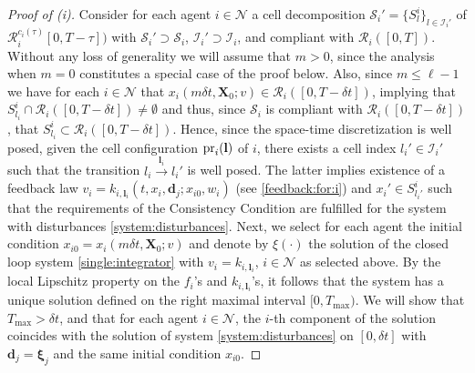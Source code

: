 \documentclass[reqno]{amsart}
\theoremstyle{plain}
\theoremstyle{definition}
\numberwithin{equation}{section}
\begin{document}
\begin{proof}[Proof of (i)]
Consider for each agent $i\in{\ensuremath{\mathcal{N}}}$ a cell decomposition ${\ensuremath{\mathcal{S}}}_i'=\{S_{l}^i\}_{l\in{\ensuremath{\mathcal{I}}}_i'}$ of ${\ensuremath{\mathcal{R}}}_i^{c_i(\tau)}[0,T-\tau])$ with ${\ensuremath{\mathcal{S}}}_i'\supset {\ensuremath{\mathcal{S}}}_i$, ${\ensuremath{\mathcal{I}}}_i'\supset {\ensuremath{\mathcal{I}}}_i$, and compliant with ${\ensuremath{\mathcal{R}}}_i([0,T])$. Without any loss of generality we will assume that $m>0$, since the analysis when $m=0$ constitutes a special case of the proof below. Also, since $m\le\ell-1$ we have for each $i\in{\ensuremath{\mathcal{N}}}$ that $x_i(m\delta t,{\textbf{{X}}}_0;v)\in{\ensuremath{\mathcal{R}}}_i([0,T-\delta t])$, implying that $S_{l_i}^i\cap {\ensuremath{\mathcal{R}}}_i([0,T-\delta t])\ne \emptyset$ and thus, since ${\ensuremath{\mathcal{S}}}_i$ is compliant with ${\ensuremath{\mathcal{R}}}_i([0,T-\delta t])$, that $S_{l_i}^i\subset{\ensuremath{\mathcal{R}}}_i([0,T-\delta t])$. Hence, since the space-time discretization is well posed, given the cell configuration ${\rm pr}_i({\textbf{{l}}})$ of $i$, there exists a cell index $l_i'\in{\ensuremath{\mathcal{I}}}_i'$ such that the transition $l_i\overset{{\textbf{{l}}}_i}{\longrightarrow}l_i'$ is well posed. The latter implies existence of a feedback law $v_i=k_{i,{\textbf{{l}}}_i}(t,x_{i},{\textbf{{d}}}_j;x_{i0},w_i)$ (see \eqref{feedback:for:i}) and $x_i'\in S_{l_i'}^i$ such that the requirements of the Consistency Condition are fulfilled for the system with disturbances \eqref{system:disturbances}. Next, we select for each agent the initial condition $x_{i0}=x_i(m\delta t,{\textbf{{X}}}_0;v)$ and denote by $\xi(\cdot)$ the solution of the closed loop system \eqref{single:integrator} with $v_i=k_{i,{\textbf{{l}}}_i}$, $i\in{\ensuremath{\mathcal{N}}}$ as selected above. By the local Lipschitz property on the $f_i$'s and $k_{i,{\textbf{{l}}}_i}$'s, it follows that the system has a unique solution defined on the right maximal interval $[0,T_{\max})$. We will show that $T_{\max}>\delta t$, and that for each agent $i\in{\ensuremath{\mathcal{N}}}$, the $i$-th component of the solution coincides with the solution of system \eqref{system:disturbances} on $[0,\delta t]$ with ${\textbf{{d}}}_j={\ensuremath{\boldsymbol{{\xi}}}}_j$ and the same initial condition $x_{i0}$.


\end{proof}
\end{document}
